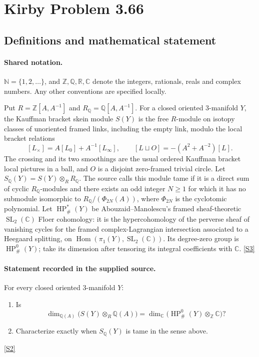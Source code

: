 \documentclass[11pt]{article}
\newcommand{\sref}[2]{\hyperlink{source:#1:#2}{[S#2]}}
\begin{document}
\section{Kirby Problem 3.66}\label{statement}

\subsection{Definitions and mathematical statement}

\paragraph{Shared notation.}$\mathbb N=\{1,2,\ldots\}$, and $\mathbb Z,\mathbb Q,\mathbb R,\mathbb C$ denote the integers, rationals, reals and complex numbers. Any other conventions are specified locally.


Put $R=\mathbb Z[A,A^{-1}]$ and $R_{\mathbb Q}=\mathbb Q[A,A^{-1}]$. For a closed oriented $3$-manifold $Y$, the Kauffman bracket skein module $S(Y)$ is the free $R$-module on isotopy classes of unoriented framed links, including the empty link, modulo the local bracket relations
\[
[L_\times]=A[L_0]+A^{-1}[L_\infty],\qquad
[L\sqcup O]=-(A^2+A^{-2})[L].
\]
The crossing and its two smoothings are the usual ordered Kauffman bracket local pictures in a ball, and $O$ is a disjoint zero-framed trivial circle. Let $S_{\mathbb Q}(Y)=S(Y)\otimes_R R_{\mathbb Q}$. The source calls this module tame if it is a direct sum of cyclic $R_{\mathbb Q}$-modules and there exists an odd integer $N\ge1$ for which it has no submodule isomorphic to $R_{\mathbb Q}/(\Phi_{2N}(A))$, where $\Phi_{2N}$ is the cyclotomic polynomial.
Let $\operatorname{HP}^*_{\#}(Y)$ be Abouzaid--Manolescu's framed sheaf-theoretic $\operatorname{SL}_2(\mathbb C)$ Floer cohomology: it is the hypercohomology of the perverse sheaf of vanishing cycles for the framed complex-Lagrangian intersection associated to a Heegaard splitting, on $\operatorname{Hom}(\pi_1(Y),\operatorname{SL}_2(\mathbb C))$. Its degree-zero group is $\operatorname{HP}^0_{\#}(Y)$; take its dimension after tensoring its integral coefficients with $\mathbb C$. \sref{statement}{3}
\paragraph{Statement recorded in the supplied source.}
For every closed oriented $3$-manifold $Y$:
\begin{enumerate}
\item Is
\[
\dim_{\mathbb Q(A)}\bigl(S(Y)\otimes_R\mathbb Q(A)\bigr)
=\dim_{\mathbb C}\bigl(\operatorname{HP}^0_{\#}(Y)\otimes_{\mathbb Z}\mathbb C\bigr)?
\]
\item Characterize exactly when $S_{\mathbb Q}(Y)$ is tame in the sense above.
\end{enumerate}
\sref{statement}{2}
\end{document}
